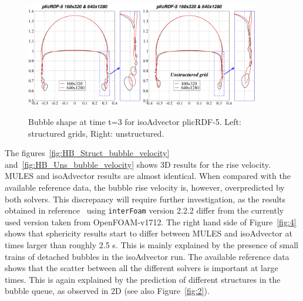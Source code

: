 \documentclass[review]{elsarticle}
\begin{document}
\begin{figure}[!h]
\begin{center}
 \includegraphics[width=0.45\textwidth]{figures/bubble_shape_t=3_plicRDF5-struct.pdf}
 \hspace{2mm}
 \includegraphics[width=0.45\textwidth]{figures/bubble_shape_t=3_plicRDF5-uns.pdf}
 \vspace{-6mm}
\end{center}
\caption{Bubble shape at time t=3 for isoAdvector plicRDF-5. Left: structured grids, Right: unstructured.}
\label{fig:HB_bubble_shape_3_plicRDF5}
\end{figure}



The figures~\ref{fig:HB_Struct_bubble_velocity} and~\ref{fig:HB_Uns_bubble_velocity} shows 3D results for the rise velocity. MULES and isoAdvector 
results are almost identical. When compared with the available reference data, the bubble rise velocity is, however, overpredicted by both solvers. 
This discrepancy will require further investigation, as the results obtained in reference~\cite{Adelsberger2014} using \verb+interFoam+ version 2.2.2 differ from the currently used version taken from OpenFOAM-v1712.
The right hand side of Figure~\ref{fig:4} shows that sphericity results start to differ between 
MULES and isoAdvector at times larger than roughly 2.5 s. This is mainly explained by the presence of small trains of detached bubbles in the isoAdvector run. The available reference data shows that the scatter between all the different solvers is important at large times. This is again explained by the prediction of different structures in the bubble queue, as observed in 2D 
(see also Figure~\ref{fig:2}).  
\end{document}
